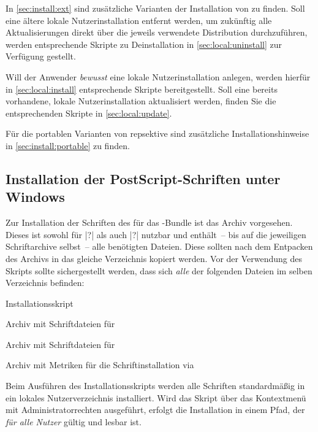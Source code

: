 In \autoref{sec:install:ext} sind zusätzliche Varianten der Installation von 
\TUDScript zu finden. Soll eine ältere lokale Nutzerinstallation entfernt 
werden, um zukünftig alle Aktualisierungen direkt über die jeweils verwendete 
Distribution durchzuführen, werden entsprechende Skripte zu Deinstallation in 
\autoref{sec:local:uninstall} zur Verfügung gestellt.

Will der Anwender \emph{bewusst} eine lokale Nutzerinstallation anlegen, werden 
hierfür in \autoref{sec:local:install} entsprechende Skripte bereitgestellt. 
Soll eine bereits vorhandene, lokale Nutzerinstallation aktualisiert werden, 
finden Sie die entsprechenden Skripte in \autoref{sec:local:update}.

Für die portablen Varianten von 
repsektive  sind zusätzliche 
Installationshinweise in \autoref{sec:install:portable} zu finden.


\subsection{Installation der PostScript-Schriften unter Windows}
%
%
Zur Installation der Schriften des \CDs für das \TUDScript-Bundle ist das Archiv
vorgesehen. Dieses ist sowohl für |?| als auch
|?| nutzbar und enthält~-- bis auf die jeweiligen 
Schriftarchive selbst~-- alle benötigten Dateien. Diese sollten nach dem 
Entpacken des Archivs in das gleiche Verzeichnis kopiert werden. Vor der 
Verwendung des Skripts  sollte sichergestellt 
werden, dass sich \emph{alle} der folgenden Dateien im selben Verzeichnis 
befinden:
%
\settowidth{}%
\begin{description}[labelwidth=\tempdim,labelsep=1em]
  \item[\File{tudscrfonts\_install.bat}]Installationsskript
  \item[\File{Univers\_PS.zip}]Archiv mit Schriftdateien für \Univers
  \item[\File{DIN\_Bd\_PS.zip}]Archiv mit Schriftdateien für \DIN
  \item[\File{tudscr\_fonts\_install.zip}]Archiv mit Metriken für die
    Schriftinstallation via 
\end{description}
%
Beim Ausführen des Installationsskripts werden alle Schriften standardmäßig in 
ein lokales Nutzerverzeichnis installiert. Wird das Skript über das Kontextmenü 
mit Administratorrechten ausgeführt, erfolgt die Installation in einem Pfad, 
der \emph{für alle Nutzer} gültig und lesbar ist.



